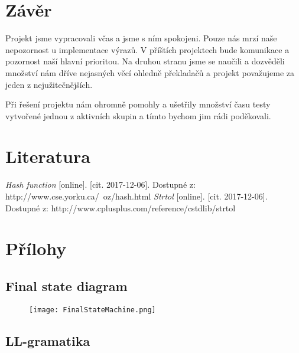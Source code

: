 \documentclass[11pt, titlepage, a4paper]{article}
\begin{document}
		\newpage
		\section{Závěr}
		\indent \indent Projekt jsme vypracovali včas a jsme s ním spokojeni. Pouze nás mrzí naše nepozornost u implementace výrazů.
		V příštích projektech bude komunikace a pozornost naší hlavní prioritou.
		Na druhou stranu jsme se naučili a dozvěděli množství nám dříve nejasných
		věcí ohledně překladačů a projekt považujeme za jeden z nejužitečnějších.

		Při řešení projektu nám ohromně pomohly a ušetřily množství času testy vytvořené jednou z aktivních skupin a tímto bychom jim rádi poděkovali.

		\section {Literatura}
		\begin{thebibliography}{1}
		\textit{Hash function} [online]. [cit. 2017-12-06]. Dostupné z: http://www.cse.yorku.ca/~oz/hash.html
		\textit{Strtol} [online]. [cit. 2017-12-06]. Dostupné z: http://www.cplusplus.com/reference/cstdlib/strtol
		\end{thebibliography}


		\newpage
		\section{Přílohy}
		\subsection{Final state diagram}
		\begin{figure}[!h]
  			\centering
  			\texttt{[image: FinalStateMachine.png]}
		\end{figure}
		\subsection{LL-gramatika}
\end{document}
